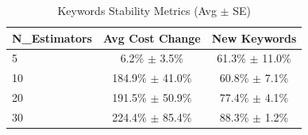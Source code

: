 \begin{table}[htbp]
\centering
\caption{Keywords Stability Metrics (Avg $\pm$ SE)}
\begin{tabular}{lcc}
\toprule
N_Estimators & Avg Cost Change & New Keywords \\
\midrule
5 & 6.2\% $\pm$ 3.5\% & 61.3\% $\pm$ 11.0\% \\
10 & 184.9\% $\pm$ 41.0\% & 60.8\% $\pm$ 7.1\% \\
20 & 191.5\% $\pm$ 50.9\% & 77.4\% $\pm$ 4.1\% \\
30 & 224.4\% $\pm$ 85.4\% & 88.3\% $\pm$ 1.2\% \\
\bottomrule
\end{tabular}
\end{table}